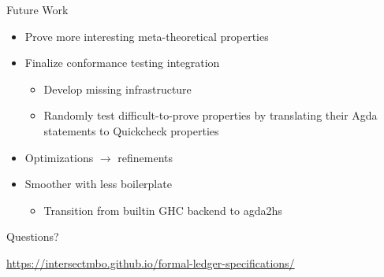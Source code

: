 \documentclass[aspectratio=169]{beamer}
\renewcommand\alert[1]{\textcolor{mLightBrown}{#1}}
\begin{document}
\begin{frame}{Future Work}
\begin{itemize}
\item Prove more interesting meta-theoretical properties
\item Finalize conformance testing integration
  \begin{itemize}
  \item Develop missing infrastructure
  \item \alert{Randomly test} difficult-to-prove properties
    by translating their Agda statements to Quickcheck properties
  \end{itemize}
\item Optimizations $\to$ refinements
\item Smoother with less boilerplate
  \begin{itemize}
  \item Transition from builtin GHC backend to \alert{agda2hs}
  \end{itemize}
\end{itemize}
\end{frame}

\begin{frame}[standout]
Questions?
\vfill
\begin{center}
\alert{\url{https://intersectmbo.github.io/formal-ledger-specifications/}}
\end{center}
\end{frame}
\end{document}
